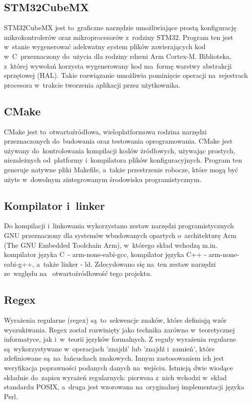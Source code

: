\subsection{STM32CubeMX} \label{sec:cube}
STM32CubeMX jest to~graficzne narzędzie umożliwiające prostą konfigurację mikrokontrolerów oraz
mikroprocesorów z~rodziny STM32. Program ten jest w~stanie wygenerować adekwatny system plików
zawierających kod w~C~przeznaczony do~użycia dla rodziny rdzeni Arm Cortex-M. Biblioteka, z~której
wywołań korzysta wygenerowany kod ma~formę warstwy abstrakcji sprzętowej (HAL). Takie rozwiązanie
umożliwia pominięcie operacji na~rejestrach procesora w~trakcie tworzenia aplikacji przez użytkownika.
\cite{stm_main}

\subsection{CMake} \label{sec:cmake}
CMake jest to~otwartoźródłowa, wieloplatformowa rodzina narzędzi przeznaczonych do~budowania oraz
testowania oprogramowania. CMake jest używany do~kontrolowania kompilacji kodów źródłowych, używając
prostych, niezależnych od~platformy i~kompilatora plików konfiguracyjnych. Program ten generuje
natywne pliki Makefile, a~także przestrzenie robocze, które mogą być użyte w~dowolnym zintegrowanym
środowisku programistycznym. \cite{cmake}

\subsection{Kompilator i~linker} \label{sec:gcc}
Do kompilacji i~linkowania wykorzystano zestaw narzędzi programistycznych GNU przeznaczony dla
systemów wbudowanych opartych o~architekturę Arm (The GNU Embedded Toolchain Arm), w~którego
skład wchodzą m.in. kompilator języka C~- arm-none-eabi-gcc, kompilator języka C++
- arm-none-eabi-g++, a~także linker - ld. Zdecydowano się na~ten zestaw narzędzi ze~względu na~
otwartoźródłowość tego projektu. \cite{toolchain}

\subsection{Regex} \label{sec:regex}
Wyrażenia regularne (regex) są~to~sekwencje znaków, które definiują wzór wyszukiwania. Regex został
rozwinięty jako technika zarówno w~teoretycznej informatyce, jak i~w~teorii języków formalnych.
Z reguły wyrażenia regularne są~wykorzystywane w~operacjach 'znajdź' lub 'znajdź i~zamień', które
zdefiniowane są~na~łańcuchach znakowych. Innym zastosowaniem ich jest weryfikacja poprawności podanych
danych na~wejściu. Istnieją dwie wiodące składnie do~zapisu wyrażeń regularnych: pierwsza z~nich
wchodzi w~skład standardu POSIX, a~druga jest wzorowana na~oryginalnej implementacji języka Perl.
\cite{regex_pl} \cite{regex_eng}

